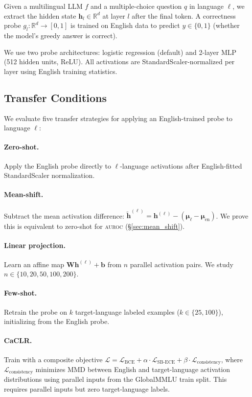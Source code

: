 \documentclass[11pt,a4paper]{article}
\newcommand{\auroc}{\textsc{auroc}}
\begin{document}
Given a multilingual LLM $f$ and a multiple-choice question $q$ in language $\ell$, we extract the hidden state $\mathbf{h}_l \in \mathbb{R}^d$ at layer $l$ after the final token. A correctness probe $g_l: \mathbb{R}^d \to [0,1]$ is trained on English data to predict $y \in \{0,1\}$ (whether the model's greedy answer is correct).

We use two probe architectures: logistic regression (default) and 2-layer MLP (512 hidden units, ReLU). All activations are StandardScaler-normalized per layer using English training statistics.

\subsection{Transfer Conditions}

We evaluate five transfer strategies for applying an English-trained probe to language $\ell$:

\paragraph{Zero-shot.} Apply the English probe directly to $\ell$-language activations after English-fitted StandardScaler normalization.

\paragraph{Mean-shift.} Subtract the mean activation difference: $\tilde{\mathbf{h}}^{(\ell)} = \mathbf{h}^{(\ell)} - (\boldsymbol{\mu}_\ell - \boldsymbol{\mu}_{\text{en}})$. We prove this is equivalent to zero-shot for \auroc{} (\S\ref{sec:mean_shift}).

\paragraph{Linear projection.} Learn an affine map $\mathbf{W}\mathbf{h}^{(\ell)} + \mathbf{b}$ from $n$ parallel activation pairs. We study $n \in \{10, 20, 50, 100, 200\}$.

\paragraph{Few-shot.} Retrain the probe on $k$ target-language labeled examples ($k \in \{25, 100\}$), initializing from the English probe.

\paragraph{CaCLR.} Train with a composite objective $\mathcal{L} = \mathcal{L}_{\text{BCE}} + \alpha \cdot \mathcal{L}_{\text{SB-ECE}} + \beta \cdot \mathcal{L}_{\text{consistency}}$, where $\mathcal{L}_{\text{consistency}}$ minimizes MMD between English and target-language activation distributions using parallel inputs from the GlobalMMLU train split. This requires parallel inputs but zero target-language labels.
\end{document}
